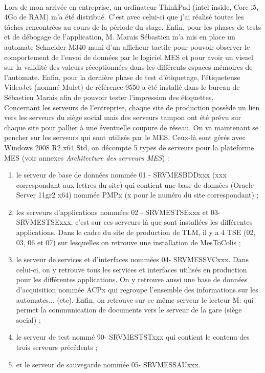 \documentclass[a4paper,12pt]{extarticle}
\newcommand{\alinea}{\hspace*{0.4cm}}
\begin{document}
		\paragraph{}
			
	Lors de mon arrivée en entreprise, un ordinateur ThinkPad (intel inside, Core i5, 4Go de RAM) m’a été distribué. C’est avec celui-ci que j’ai réalisé toutes les tâches rencontrées au cours de la période du stage. Enfin, pour les phases de tests et de débogage de l’application, M. Marais Sébastien m’a mis en place un automate Schneider M340 muni d’un afficheur tactile pour pouvoir observer le comportement de l'envoi de données par le logiciel MES et pour avoir un visuel sur la validité des valeurs réceptionnées dans les différents espaces mémoires de l'automate. Enfin, pour la dernière phase de test d'étiquetage, l’étiqueteuse VideoJet (nommé Mulet) de référence 9550 a été installé dans le bureau de Sébastien Marais afin de pouvoir tester l’impression des étiquettes.\\
\alinea
	Concernant les serveurs de l’entreprise, chaque site de production possède un lien vers les serveurs du siège social mais des serveurs tampon ont été prévu sur chaque site pour pallier à une éventuelle coupure de réseau. On va maintenant se pencher sur les serveurs qui sont utilisés par le MES. Ceux-là sont gérés avec Windows 2008 R2 x64 Std, on décompte 5 types de serveurs pour la plateforme MES (voir annexes \emph{Architecture des serveurs MES}) : 

\begin{enumerate}[-]
	\item le serveur de base de données nommée 01 - SRVMESBDDxxx (xxx correspondant aux lettres du site) qui contient une base de données (Oracle Server 11gr2 x64) nommée PMPx (x pour le numéro du site correspondant) ;
	\item les serveurs d’applications nommées 02 - SRVMESTSExxx et 03- SRVMESTSExxx, c’est sur ces serveurs-là que sont installées les différentes applications. Dans le cadre du site de production de TLM, il y a 4 TSE (02, 03, 06 et 07) sur lesquelles on retrouve une installation de MesToColis ;
	\item le serveur de services et d’interfaces nommées 04- SRVMESSVCxxx. Dans celui-ci, on y retrouve tous les services et interfaces utilisés en production pour les différentes applications. On y retrouve aussi une base de données d’acquisition nommée ACPx qui regroupe l’ensemble des informations sur les automates... (etc).
Enfin, on retrouve sur ce même serveur le lecteur M: qui permet la communication de documents vers le serveur de la gare (siège social) ;
	\item le serveur de test nommé 90- SRVMESTSTxxx qui contient le contenu des trois serveurs précédents ;
	\item et le serveur de sauvegarde nommée 05- SRVMESSAUxxx.
\end{enumerate}
\end{document}
